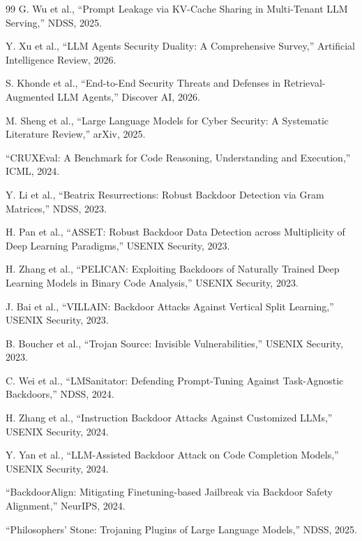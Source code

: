 \documentclass[11pt,a4paper,onecolumn]{article}
\begin{document}
\begin{thebibliography}{99}
G. Wu et al., ``Prompt Leakage via KV-Cache Sharing in Multi-Tenant LLM Serving,'' NDSS, 2025.

Y. Xu et al., ``LLM Agents Security Duality: A Comprehensive Survey,'' Artificial Intelligence Review, 2026.

S. Khonde et al., ``End-to-End Security Threats and Defenses in Retrieval-Augmented LLM Agents,'' Discover AI, 2026.

M. Sheng et al., ``Large Language Models for Cyber Security: A Systematic Literature Review,'' arXiv, 2025.

``CRUXEval: A Benchmark for Code Reasoning, Understanding and Execution,'' ICML, 2024.


Y. Li et al., ``Beatrix Resurrections: Robust Backdoor Detection via Gram Matrices,'' NDSS, 2023.

H. Pan et al., ``ASSET: Robust Backdoor Data Detection across Multiplicity of Deep Learning Paradigms,'' USENIX Security, 2023.

H. Zhang et al., ``PELICAN: Exploiting Backdoors of Naturally Trained Deep Learning Models in Binary Code Analysis,'' USENIX Security, 2023.

J. Bai et al., ``VILLAIN: Backdoor Attacks Against Vertical Split Learning,'' USENIX Security, 2023.

B. Boucher et al., ``Trojan Source: Invisible Vulnerabilities,'' USENIX Security, 2023.

C. Wei et al., ``LMSanitator: Defending Prompt-Tuning Against Task-Agnostic Backdoors,'' NDSS, 2024.

H. Zhang et al., ``Instruction Backdoor Attacks Against Customized LLMs,'' USENIX Security, 2024.

Y. Yan et al., ``LLM-Assisted Backdoor Attack on Code Completion Models,'' USENIX Security, 2024.

``BackdoorAlign: Mitigating Finetuning-based Jailbreak via Backdoor Safety Alignment,'' NeurIPS, 2024.

``Philosophers' Stone: Trojaning Plugins of Large Language Models,'' NDSS, 2025.


\end{thebibliography}
\end{document}
